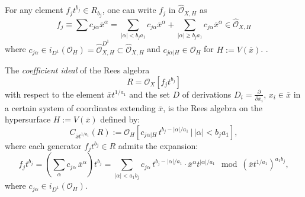 \documentclass{amsart}
\newcommand{\cO}{{\mathcal O}}
\begin{document}
For any element  $f_jt^{b_j} \in R_{b_j}$, one can write $f_j$ in $\widehat{\cO}_{X,H}$  as $$f_j\equiv \sum c_{j\alpha} \overline{x}^\alpha =\sum_{  |\alpha|<  b_j a_1} c_{j\alpha} \overline{x}^\alpha + \sum_{  |\alpha|\geq  b_j a_1} c_{j\alpha} \overline{x}^\alpha \in \widehat{\cO}_{X,H}$$ 
 where $ c_{j\alpha}\in i_{D^1}({\cO}_{H})=\widehat{\cO}_{X,H}^{D^1} \subset   \widehat{\cO}_{X,H}$ and $c_{j\alpha|H}\in \cO_H$ for $H:=V(\overline{x})$.
 .

\begin{definition}
The \emph{coefficient ideal} of the Rees algebra 
\[
R = \mathcal{O}_X[f_j t^{b_j}]
\]
with respect to the element \(\overline{x} t^{1/a_1}\) and the set $D$ of derivations $D_i=\frac{\partial}{\partial x_i}$, $x_i\in \overline{x}$ in a certain system of coordinates extending $\overline{x}$, is the Rees algebra on the hypersurface \(H := V(\overline{x})\) defined by:
\[
C_{\overline{x} t^{1/a_1}}(R) := \mathcal{O}_H\left[c_{j\alpha|H} \, t^{b_j - |\alpha|/a_1} \,\big|\, |\alpha| < b_j a_1 \right],
\]
where each generator \(f_j t^{b_j} \in R\) admits the expansion:
\[
f_j t^{b_j} = \left( \sum_{\alpha} c_{j\alpha} \, \overline{x}^\alpha \right) t^{b_j} 
= \sum_{|\alpha| < a_1 b_j} c_{j\alpha} \, t^{b_j - |\alpha|/a_1} \cdot \overline{x}^\alpha t^{|\alpha|/a_1} \mod (\overline{x}t^{1/a_1})^{a_1 b_j}
,\] where $c_{j\alpha} \in i_{D^1}(\cO_H)$.
\end{definition}%
\end{document}
